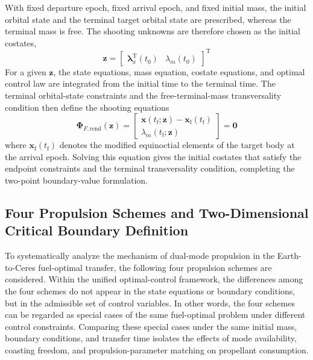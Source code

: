 ﻿\documentclass{IEEEtaes}
\begin{document}
With fixed departure epoch, fixed arrival epoch, and fixed initial mass, the initial orbital state and the terminal target orbital state are prescribed, whereas the terminal mass is free. The shooting unknowns are therefore chosen as the initial costates,
\begin{equation}
\bm{z}=\begin{bmatrix}\bm{\lambda}_x^{\mathrm{T}}(t_0)&\lambda_m(t_0)\end{bmatrix}^{\mathrm{T}}
\end{equation}
For a given $\bm{z}$, the state equations, mass equation, costate equations, and optimal control law are integrated from the initial time to the terminal time. The terminal orbital-state constraints and the free-terminal-mass transversality condition then define the shooting equations
\begin{equation}
\bm{\Phi}_{F,\mathrm{rend}}(\bm{z})=
\begin{bmatrix}
\bm{x}(t_{\mathrm{f}};\bm{z})-\bm{x}_{\mathrm{f}}(t_{\mathrm{f}})\\
\lambda_m(t_{\mathrm{f}};\bm{z})
\end{bmatrix}=\bm{0}
\end{equation}
where $\bm{x}_{\mathrm{f}}(t_{\mathrm{f}})$ denotes the modified equinoctial elements of the target body at the arrival epoch. Solving this equation gives the initial costates that satisfy the endpoint constraints and the terminal transversality condition, completing the two-point boundary-value formulation.

\subsection{Four Propulsion Schemes and Two-Dimensional Critical Boundary Definition}
To systematically analyze the mechanism of dual-mode propulsion in the Earth-to-Ceres fuel-optimal transfer, the following four propulsion schemes are considered. Within the unified optimal-control framework, the differences among the four schemes do not appear in the state equations or boundary conditions, but in the admissible set of control variables. In other words, the four schemes can be regarded as special cases of the same fuel-optimal problem under different control constraints. Comparing these special cases under the same initial mass, boundary conditions, and transfer time isolates the effects of mode availability, coasting freedom, and propulsion-parameter matching on propellant consumption.
\end{document}
